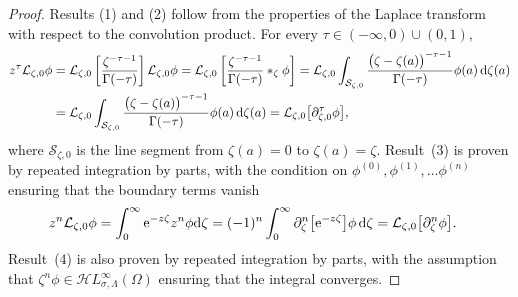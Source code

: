 \documentclass[pdftex]{sigma}
\newcommand{\singexp}[2]{\mathcal{H}L^\infty_{#1, #2}}
\newcommand{\fracderiv}[3]{\partial^{#1}_{#2, #3}}
\newcommand{\laplace}{\mathcal{L}}
\numberwithin{equation}{section}
\begin{document}
\begin{proof}
Results (1) and (2) follow from the properties of the Laplace transform with respect to the convolution product. For every $\tau \in (-\infty, 0) \cup (0,1)$,
\begin{align*}
z^\tau\laplace_{\zeta,0}\phi&=\laplace_{\zeta,0}\left[\frac{\zeta^{-\tau-1}}{\Gamma(-\tau)}\right] \laplace_{\zeta,0}\phi=\laplace_{\zeta,0}\left[\frac{\zeta^{-\tau-1}}{\Gamma(-\tau)} \ast_\zeta \phi\right] =\laplace_{\zeta,0} \int_{\mathcal{S}_{\zeta,0}}\frac{\bigl(\zeta-\zeta(a)\bigr)^{-\tau-1}}{\Gamma(-\tau)} \phi(a)\, {\rm d}\zeta(a)\\
&=\laplace_{\zeta,0} \int_{\mathcal{S}_{\zeta,0} }\frac{\bigl(\zeta-\zeta(a)\bigr)^{-\tau-1}}{\Gamma(-\tau)} \phi(a) \, {\rm d}\zeta(a)=\laplace_{\zeta,0}\bigl[\fracderiv{\tau}{\zeta}{0}\phi\bigr],
\end{align*}
where $\mathcal{S}_{\zeta,0}$ is the line segment from $\zeta(a)=0$ to $\zeta(a) = \zeta$. Result~(3) is proven by repeated integration by parts, with the condition on $\phi^{(0)}, \phi^{(1)}, \dots \phi^{(n)}$ ensuring that the boundary terms vanish
\begin{align*}
 z^n\laplace_{\zeta,0}\phi&=\int_0^\infty {\rm e}^{-z\zeta} z^n \phi {\rm d}\zeta=(-1)^n\int_0^\infty \partial_\zeta^n \bigl[{\rm e}^{-z\zeta}\bigr] \phi \, {\rm d}\zeta=\laplace_{\zeta,0}\bigl[\partial_\zeta^n \phi\bigr].
\end{align*}
Result~(4) is also proven by repeated integration by parts, with the assumption that $\zeta^n\phi\in\singexp{\sigma}{\Lambda}(\Omega)$ ensuring that the integral converges.
\end{proof}
\end{document}
